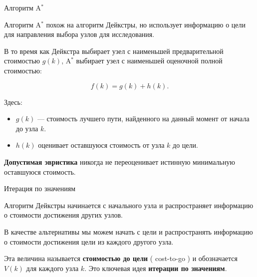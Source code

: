 \documentclass{beamer}
\begin{document}
	\begin{frame}{Алгоритм A$^\ast$}
		\begin{flushleft}
			
			Алгоритм A$^\ast$ похож на алгоритм Дейкстры,
			но использует информацию о цели
			для направления выбора узлов для исследования.
			
			\medskip
			В то время как Дейкстра выбирает узел с наименьшей
			предварительной стоимостью $g(k)$, A$^\ast$ выбирает узел
			с наименьшей оценочной полной стоимостью:
			
			\[
			f(k)=g(k)+h(k).
			\]
			
			Здесь:
			\begin{itemize}
				\item $g(k)$ — стоимость лучшего пути,
				найденного на данный момент от начала до узла $k$.
				\item $h(k)$ оценивает оставшуюся стоимость
				от узла $k$ до цели.
			\end{itemize}
			
			\textbf{Допустимая эвристика} никогда не переоценивает
			истинную минимальную оставшуюся стоимость.
			
		\end{flushleft}
	\end{frame}
	
	
	
	
	\begin{frame}{Итерация по значениям}
		\begin{flushleft}
			
			Алгоритм Дейкстры начинается с начального узла
			и распространяет информацию о стоимости
			достижения других узлов.
			
			
			\medskip
			
			В качестве альтернативы мы можем начать с цели и
			распространять информацию о стоимости достижения
			цели из каждого другого узла.
			
			\bigskip
			Эта величина называется \textbf{стоимостью до цели}
			( cost-to-go ) и обозначается $V(k)$ для каждого узла $k$. Это ключевая идея \textbf{итерации по значениям}.
			
		\end{flushleft}
	\end{frame}
	
\end{document}
